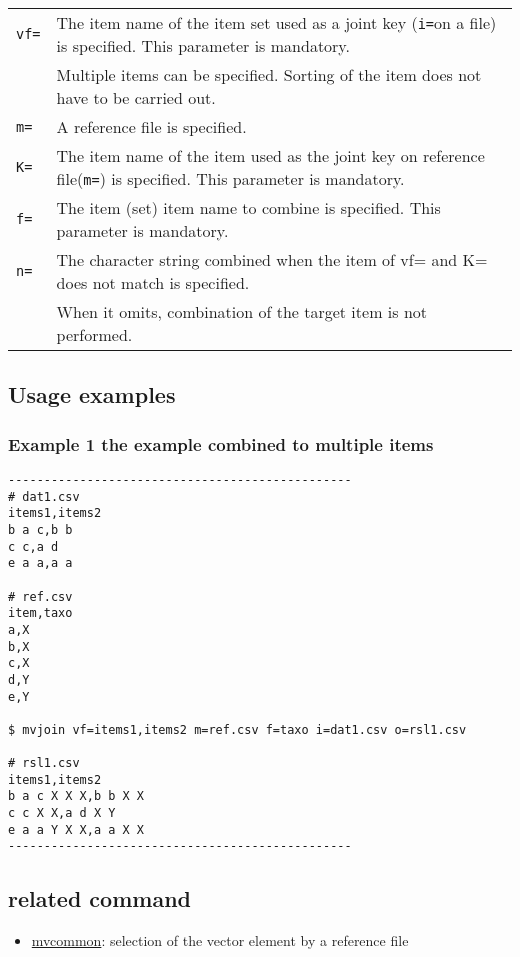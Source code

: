 \begin{table}[htbp]
{\small
\begin{tabular}{ll}
\verb|vf=| & The item name of the item set used as a joint key (\verb|i=|on a file) is specified. 
This parameter is mandatory.\\
           & Multiple items can be specified. Sorting of the item does not have to be carried out.  \\
\verb|m=|  & A reference file is specified. \\
\verb|K=|  & The item name of the item used as the joint key on reference file(\verb|m=|) is specified. 
This parameter is mandatory.\\
\verb|f=|  & The item (set) item name to combine is specified. 
This parameter is mandatory.\\
\verb|n=|  & The character string combined when the item of vf= and K= does not match is specified.  \\
           & When it omits, combination of the target item is not performed. 
 \\
\end{tabular}
}
\end{table} 

\subsection*{Usage examples}
\subsubsection*{Example 1 the example combined to multiple items}
\begin{verbatim}
------------------------------------------------
# dat1.csv
items1,items2
b a c,b b
c c,a d
e a a,a a

# ref.csv
item,taxo
a,X
b,X
c,X
d,Y
e,Y

$ mvjoin vf=items1,items2 m=ref.csv f=taxo i=dat1.csv o=rsl1.csv

# rsl1.csv
items1,items2
b a c X X X,b b X X
c c X X,a d X Y
e a a Y X X,a a X X
------------------------------------------------
\end{verbatim}

\subsection*{related command}
\begin{itemize}
\item \href{run:mvcommon.pdf}{mvcommon}: selection of the vector element by a reference file 

\end{itemize}


